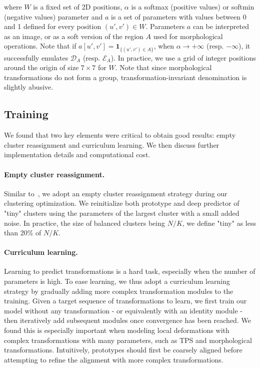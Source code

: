 \documentclass{article}
\begin{document}
where $W$ is a fixed set of 2D positions, $\alpha$ is a softmax (positive values) or softmin 
(negative values) parameter and $a$ is a set of parameters with values between 0 and 1 
defined for every position $(u',v')\in W$. Parameters $a$ can be interpreted as an image, or 
as a soft version of the region $A$ used for morphological operations. Note that if 
$a[u',v']=\mathbf{1}_{\{(u',v')\in A\}}$, when $\alpha \rightarrow +\infty$ (resp.  
$-\infty$), it successfully emulates $\mathcal{D}_A$ (resp. $\mathcal{E}_A$). In practice, we 
use a grid of integer positions around the origin of size $7\times 7$ for $W$. Note that 
since morphological transformations do not form a group, transformation-invariant 
denomination is slightly abusive.

\subsection{Training}\label{sec:training}

We found that two key elements were critical to obtain good results: empty cluster 
reassignment and curriculum learning. We then discuss further implementation details and 
computational cost.

\vspace{-0.7em}
\paragraph{Empty cluster reassignment.} Similar 
to~\cite{caronDeepClusteringUnsupervised2018}, we adopt an empty cluster reassignment 
strategy during our clustering optimization. We reinitialize both prototype and deep 
predictor of "tiny" clusters using the parameters of the largest cluster with a small added 
noise. In practice, the size of balanced clusters being $N/K$, we define "tiny" as less than 
20\% of $N/K$.

\vspace{-0.7em}
\paragraph{Curriculum learning.} Learning to predict transformations is a hard task, 
especially when the number of parameters is high. To ease learning, we thus adopt a 
curriculum learning strategy by gradually adding more complex transformation modules to the 
training.  Given a target sequence of transformations to learn, we first train our model 
without any transformation - or equivalently with an identity module - then iteratively add 
subsequent modules once convergence has been reached. We found this is especially important 
when modeling local deformations with complex transformations with many parameters, such as 
TPS and morphological transformations.  Intuitively, prototypes should first be coarsely 
aligned before attempting to refine the alignment with more complex transformations.
\end{document}
